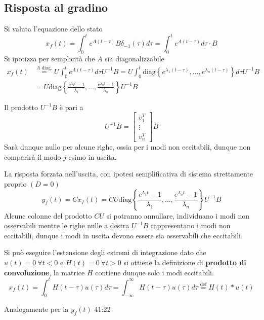 \subsection{Risposta al gradino}
Si valuta l'equazione dello stato
$$
x_f(t) = \int_0^t e^{A(t-\tau)}B\delta_{-1}(\tau)d\tau =
\int_0^t e^{A(t-\tau)} d\tau\cdot B
$$
Si ipotizza per semplicità che $A$ sia
diagonalizzabile
$$\begin{aligned}
x_f(t)&\stackrel{A\text{ diag.}}{=}
U\int_0^t e^{\Lambda(t-\tau)}d\tau U^{-1} B = U
\int_0^t\text{diag}\left\{e^{\lambda_1(t-\tau)}
,\ldots,e^{\lambda_n(t-\tau)}
\right\} d \tau U^{-1}B\\
&= U\text{diag}\left\{
\frac{e^{\lambda_1t}-1}{\lambda_1},\ldots,\frac{e^{\lambda_nt}-1}{\lambda_n}
\right\}U^{-1}B
\end{aligned}$$

Il prodotto $U^{-1}B$ è pari a
$$
U^{-1}B = \begin{bmatrix}
           v_1^T \\
           \vdots \\
           v_n^T
          \end{bmatrix}B
$$
Sarà dunque nullo per alcune righe, ossia per i modi non eccitabili, dunque non
comparirà il modo $j$-esimo in uscita.

La risposta forzata nell'uscita, con ipotesi semplificativa di sistema
strettamente proprio $(D=0)$
$$
y_f(t) = Cx_f(t) = CU\text{diag}\left\{
\frac{e^{\lambda_1t}-1}{\lambda_1},\ldots,\frac{e^{\lambda_nt}-1}{\lambda_n}
\right\}U^{-1}B
$$
Alcune colonne del prodotto $CU$ si potranno annullare, individuano i modi non
osservabili mentre le righe nulle a destra $U^{-1}B$ rappresentano i modi non
eccitabili, dunque i modi in uscita devono essere sia osservabili che
eccitabili.

Si può eseguire l'estensione degli estremi di integrazione dato che
$u(t)=0\ \forall t<0$ e $H(t) = 0\ \forall t>0$
si ottiene la definizione di \textbf{prodotto di convoluzione}, la matrice $H$
contiene dunque solo i modi eccitabili.
$$
x_f(t) = \int_0^t H(t-\tau) u(\tau) d\tau = \int_{-\infty}^{\infty} H(t-\tau)
u(\tau)d\tau \stackrel{\text{def}}{=} H(t)*u(t)
$$

Analogamente per la $y_f(t)$
41:22
